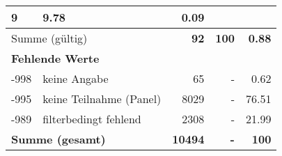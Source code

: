 \begin{longtable}{lXrrr}
       \num{9} &
       \num[round-mode=places,round-precision=2]{9,78} &
         \num[round-mode=places,round-precision=2]{0,09} \\
     \midrule
     \multicolumn{2}{l}{Summe (gültig)} &
       \textbf{\num{92}} &
     \textbf{100} &
       \textbf{\num[round-mode=places,round-precision=2]{0,88}} \\
     \multicolumn{5}{l}{\textbf{Fehlende Werte}}\\
       -998 &
       keine Angabe &
         \num{65} &
        - &
         \num[round-mode=places,round-precision=2]{0,62} \\
       -995 &
       keine Teilnahme (Panel) &
         \num{8029} &
        - &
         \num[round-mode=places,round-precision=2]{76,51} \\
       -989 &
       filterbedingt fehlend &
         \num{2308} &
        - &
         \num[round-mode=places,round-precision=2]{21,99} \\
     \midrule
     \multicolumn{2}{l}{\textbf{Summe (gesamt)}} &
          \textbf{\num{10494}} &
        \textbf{-} &
        \textbf{100} \\
     \bottomrule
     \end{longtable}
     
